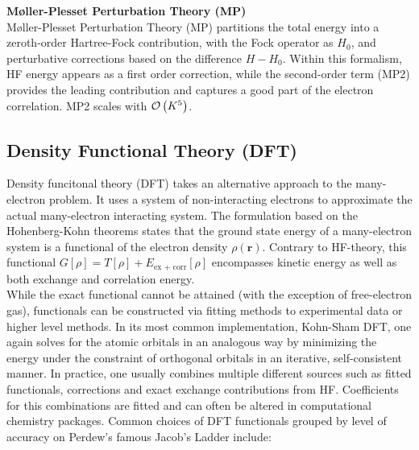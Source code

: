 \textbf{Møller-Plesset Perturbation Theory (MP)}\\
Møller-Plesset Perturbation Theory (MP) partitions the total energy into a zeroth-order Hartree-Fock contribution, with the Fock operator as $H_0$, and perturbative corrections based on the difference $H - H_0$. Within this formalism, HF energy appears as a first order correction, while the second-order term (MP2) provides the leading contribution and captures a good part of the electron correlation. MP2 scales with $\mathcal{O}\left(K^5\right)$. 

\subsection{Density Functional Theory (DFT)}
\label{subsec:background_dft}
Density funcitonal theory (DFT) takes an alternative approach to the many-electron problem. It uses a system of non-interacting electrons to approximate the actual many-electron interacting system. The formulation based on the Hohenberg-Kohn theorems \parencite{ref:hohenberg_kohn1964} states that the ground state energy of a many-electron system is a functional of the electron density $\rho(\mathbf{r})$. Contrary to HF-theory, this functional $G[\rho] = T[\rho] + E_{\text{ex + corr}}[\rho]$ encompasses kinetic energy as well as both exchange and correlation energy. \parencite{ref:kohn_sham_1965}\\
While the exact functional cannot be attained (with the exception of free-electron gas), functionals can be constructed via fitting methods to experimental data or higher level methods.  
In its most common implementation, Kohn-Sham DFT, one again solves for the atomic orbitals in an analogous way by minimizing the energy under the constraint of orthogonal orbitals in an iterative, self-consistent manner. In practice, one usually combines multiple different sources such as fitted functionals, corrections and exact exchange contributions from HF. Coefficients for this combinations are fitted and can often be altered in computational chemistry packages. 
Common choices of DFT functionals grouped by level of accuracy on Perdew's famous Jacob's Ladder \parencite{ref:perdew_jacobs_ladder} include:

